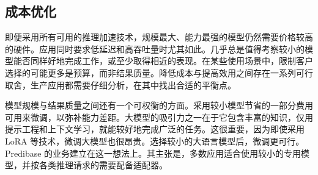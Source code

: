 \subsection{成本优化}
即便采用所有可用的推理加速技术，规模最大、能力最强的模型仍然需要价格较高的硬件。应用同时要求低延迟和高吞吐量时尤其如此。几乎总是值得考察较小的模型能否同样好地完成工作，或至少取得相近的表现。在某些使用场景中，限制客户选择的可能更多是预算，而非结果质量。降低成本与提高效用之间存在一系列可行取舍，生产应用都需要仔细分析，在其中找出合适的平衡点。

模型规模与结果质量之间还有一个可权衡的方面。采用较小模型节省的一部分费用可用来微调，以弥补能力差距。大模型的吸引力之一在于它包含丰富的知识，仅用提示工程和上下文学习，就能较好地完成广泛的任务。这很重要，因为即使采用 LoRA 等技术，微调大模型也很昂贵。选择较小的大语言模型后，微调更可行。Predibase 的业务建立在这一想法上。其主张是，多数应用适合使用较小的专用模型，并按各类推理请求的需要配备适配器。
